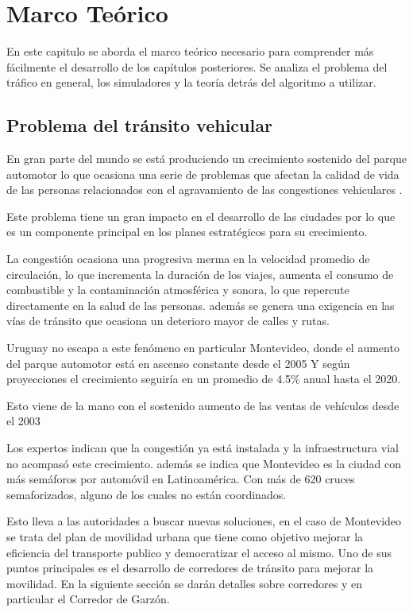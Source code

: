 \chapter{Marco Teórico}

 En este capitulo se aborda el marco teórico necesario para comprender más fácilmente el desarrollo de los capítulos posteriores. Se analiza el problema del tráfico en general, los simuladores y la teoría detrás del algoritmo a utilizar.

\section{Problema del tránsito vehicular}

En gran parte del mundo se está produciendo un crecimiento sostenido del parque automotor lo que ocasiona una serie de problemas que afectan la calidad de vida de las personas relacionados con el agravamiento de las congestiones vehiculares \citep{Cepal2003}.

Este problema tiene un gran impacto en el desarrollo de las ciudades por lo que es un componente principal en los planes estratégicos para su crecimiento.

La congestión ocasiona una progresiva merma en la velocidad promedio de circulación, lo que incrementa la duración de los viajes, aumenta el consumo de combustible y la contaminación atmosférica y sonora, lo que repercute directamente en la salud de las personas. 
además se genera una exigencia en las vías de tránsito que ocasiona un deterioro mayor de calles y rutas.

Uruguay no escapa a este fenómeno en particular Montevideo, donde el aumento del parque automotor está en ascenso constante desde el 2005 \citep{INE2014} 
Y según proyecciones el crecimiento seguiría en un promedio de 4.5\% anual hasta el 2020. \citep{BBVA2013}

Esto viene de la mano con el sostenido aumento de las ventas de vehículos  desde el 2003 \citep{Autoanuario2014}

Los expertos indican que la congestión ya está instalada y la infraestructura vial no acompasó este crecimiento. además se indica que Montevideo es la ciudad con más semáforos por automóvil en Latinoamérica. Con más de 620 cruces semaforizados, alguno de los cuales no están coordinados.\citep{Subrayado2013}

Esto lleva a las autoridades a buscar nuevas soluciones, en el caso de Montevideo se trata del plan de movilidad urbana \citep{PlanMovilidad} que tiene como objetivo mejorar la eficiencia del transporte publico y democratizar el acceso al mismo. Uno de sus puntos principales es el desarrollo de corredores de tránsito para mejorar la movilidad. En la siguiente sección se darán detalles sobre corredores y en particular el Corredor de Garzón.

